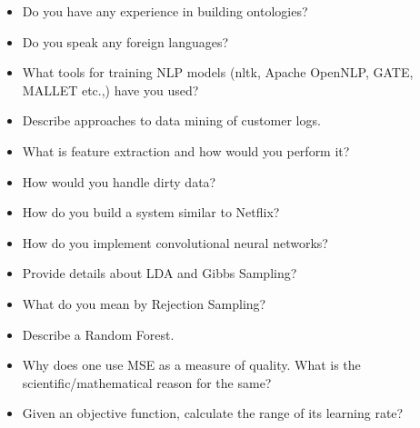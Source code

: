 \documentclass{article}
\begin{document}
\begin{itemize}
	\item Do you have any experience in building ontologies?
	\item Do you speak any foreign languages?
	\item What tools for training NLP models (nltk, Apache OpenNLP, GATE, MALLET etc.,) have you used?
	\item Describe approaches to data mining of customer logs.
	\item What is feature extraction and how would you perform it?
	\item How would you handle dirty data?
	\item How do you build a system similar to Netflix?
	\item How do you implement convolutional neural networks?
	\item Provide details about LDA and Gibbs Sampling?
	\item What do you mean by Rejection Sampling?
	\item Describe a Random Forest.
	\item Why does one use MSE as a measure of quality. What is the scientific/mathematical reason for the same?
	\item Given an objective function, calculate the range of its learning rate?
\end{itemize}
\end{document}
